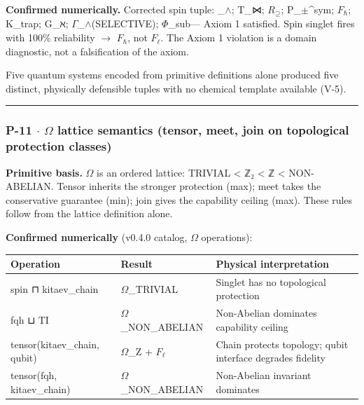 \documentclass[12pt,a4paper]{article}
\begin{document}
\textbf{Confirmed numerically.} Corrected spin tuple: \langleD\_$\land$; T\_⋈; $R_{\supseteq}$; P\_$\pm$\^{}sym; $F_{\hbar}$; K\_trap; G\_ℵ; $\Gamma$\_$\land$(SELECTIVE); $\Phi$\_sub\rangle --- Axiom 1 satisfied. Spin singlet fires with 100\% reliability $\rightarrow$ $F_{\hbar}$, not $F_{\ell}$. The Axiom 1 violation is a domain diagnostic, not a falsification of the axiom.

Five quantum systems encoded from primitive definitions alone produced five distinct, physically defensible tuples with no chemical template available (V-5).

\begin{center}
\rule{0.5\textwidth}{0.4pt}
\end{center}

\subsubsection{P-11 $\cdot$ $\Omega$ lattice semantics (tensor, meet, join on topological protection classes)}

\textbf{Primitive basis.} $\Omega$ is an ordered lattice: TRIVIAL \textless{} ℤ₂ \textless{} ℤ \textless{} NON-ABELIAN. Tensor inherits the stronger protection (max); meet takes the conservative guarantee (min); join gives the capability ceiling (max). These rules follow from the lattice definition alone.

\textbf{Confirmed numerically} (v0.4.0 catalog, $\Omega$ operations):

\begin{table}[htbp]
\centering
\small
{}
\begin{tabularx}{\textwidth}{>{\centering\arraybackslash}X >{\centering\arraybackslash}X >{\centering\arraybackslash}X}
\toprule
\rowcolor{gray!25}\textbf{Operation} & \textbf{Result} & \textbf{Physical interpretation} \\
\midrule
\rowcolors{1}{white}{gray!10}
spin ⊓ kitaev\_chain & $\Omega$\_TRIVIAL & Singlet has no topological protection \\
fqh ⊔ TI & $\Omega$\_NON\_ABELIAN & Non-Abelian dominates capability ceiling \\
tensor(kitaev\_chain, qubit) & $\Omega$\_Z + $F_{\ell}$ & Chain protects topology; qubit interface degrades fidelity \\
tensor(fqh, kitaev\_chain) & $\Omega$\_NON\_ABELIAN & Non-Abelian invariant dominates \\
\bottomrule
\end{tabularx}
\end{table}
\end{document}
